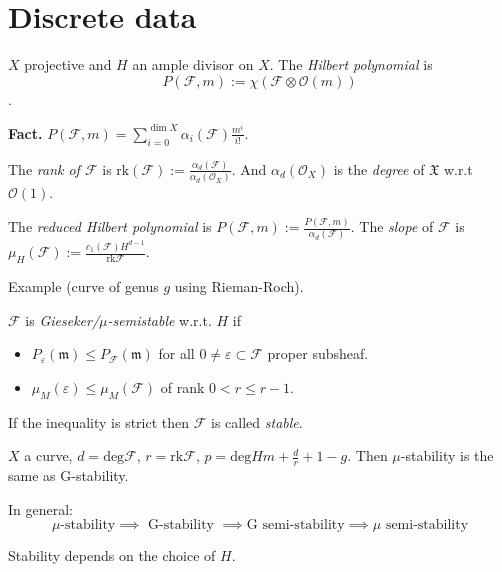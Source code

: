 \section*{Discrete data}
\label{section-discrete-data}

$X$ projective and $H$ an ample divisor on $X$. The {\it Hilbert polynomial} is
$$
P(\mathcal{F},m):=\chi(\mathcal{F}\otimes \mathcal{O}(m))
$$.

{\bf Fact.} $P(\mathcal{F},m)=\sum_{i=0}^{\dim
X}\alpha_i(\mathcal{F})\frac{m^i}{i!}$.

The {\it rank of $\mathcal{F}$} is
$\text{rk}(\mathcal{F}):=\frac{\alpha_d(\mathcal{F})}{\alpha_d(\mathcal{O}_X)}$.
And $\alpha_d(\mathcal{O}_X)$ is the {\it degree} of $\mathfrak{X}$ w.r.t
$\mathcal{O}(1)$.

The {\it reduced Hilbert polynomial} is
$P(\mathcal{F},m):=\frac{P(\mathcal{F},m)}{\alpha_d(\mathcal{F})}$. The {\it
slope} of $\mathcal{F}$ is
$\mu_H(\mathcal{F}):=\frac{c_1(\mathcal{F})H^{d-1}}{\text{rk}\mathcal{F}}$.

Example (curve of genus $g$ using Rieman-Roch).

\begin{definition}
\label{definition-Gieseker-and-mu-stability}
$\mathcal{F}$ is {\it Gieseker/$\mu$-semistable} w.r.t. $H$ if
\begin{itemize}
\item $P_\varepsilon(\mathfrak{m})\leq P_{\mathcal{F}}(\mathfrak{m})$ for all $0
\neq  \varepsilon \subset \mathcal{F}$ proper subsheaf.
\item $\mu_{M}(\varepsilon) \leq  \mu_{M}(\mathcal{F})$ of rank $0<r \leq r-1$.
\end{itemize}
If the inequality is strict then $\mathcal{F}$ is called {\it stable}.
\end{definition}

\begin{example}
\label{example-G-and-mu-stability-coincide-in-curve}
$X$ a curve, $d=\text{deg}\mathcal{F}$, $r=\text{rk}\mathcal{F}$,
$p=\text{deg}Hm+\frac{d}{r}+1-g$. Then $\mu$-stability is the same as
G-stability.
\end{example}
In general:
$$
\mu\text{-stability}\implies \text{ G-stability }\implies \text{G semi-stability
}\implies \mu \text{ semi-stability}
$$
\begin{remark}
\label{remark-stability-depends-on-H}
Stability depends on the choice of $H$.
\end{remark}

